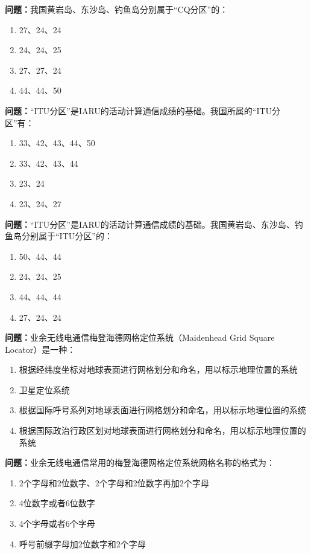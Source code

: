\bigskip


\noindent\textbf{问题：}我国黄岩岛、东沙岛、钓鱼岛分别属于“CQ分区”的：
\begin{enumerate}[label=\Alph*), leftmargin=3em]
\item 27、24、24
\item 24、24、25
\item 27、27、24
\item 44、44、50
\end{enumerate}

\bigskip


\noindent\textbf{问题：}“ITU分区”是IARU的活动计算通信成绩的基础。我国所属的“ITU分区”有：
\begin{enumerate}[label=\Alph*), leftmargin=3em]
\item 33、42、43、44、50
\item 33、42、43、44
\item 23、24
\item 23、24、27
\end{enumerate}

\bigskip


\noindent\textbf{问题：}“ITU分区”是IARU的活动计算通信成绩的基础。我国黄岩岛、东沙岛、钓鱼岛分别属于“ITU分区”的：
\begin{enumerate}[label=\Alph*), leftmargin=3em]
\item 50、44、44
\item 24、24、25
\item 44、44、44
\item 27、24、24
\end{enumerate}

\bigskip


\noindent\textbf{问题：}业余无线电通信梅登海德网格定位系统（Maidenhead Grid Square Locator）是一种：
\begin{enumerate}[label=\Alph*), leftmargin=3em]
\item 根据经纬度坐标对地球表面进行网格划分和命名，用以标示地理位置的系统
\item 卫星定位系统
\item 根据国际呼号系列对地球表面进行网格划分和命名，用以标示地理位置的系统
\item 根据国际政治行政区划对地球表面进行网格划分和命名，用以标示地理位置的系统
\end{enumerate}

\bigskip


\noindent\textbf{问题：}业余无线电通信常用的梅登海德网格定位系统网格名称的格式为：
\begin{enumerate}[label=\Alph*), leftmargin=3em]
\item 2个字母和2位数字、2个字母和2位数字再加2个字母
\item 4位数字或者6位数字
\item 4个字母或者6个字母
\item 呼号前缀字母加2位数字和2个字母
\end{enumerate}

